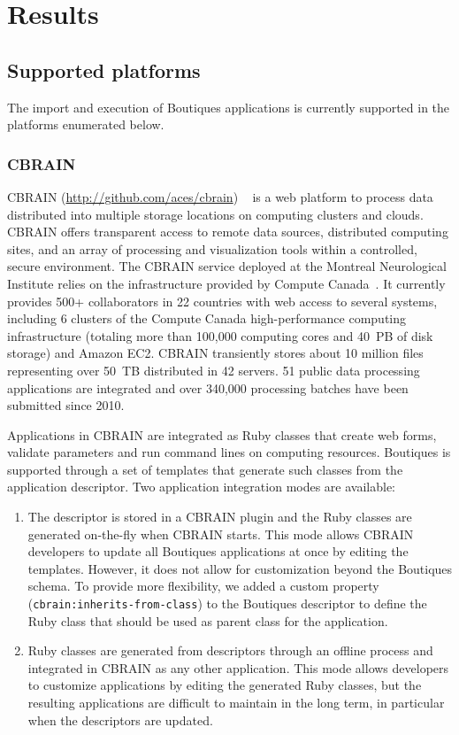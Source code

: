 \documentclass[a4paper,num-refs]{oup-contemporary}
\newcommand{\boutiques}{Boutiques\xspace}
\begin{document}
\section{Results}

\subsection{Supported platforms}

The import and execution of \boutiques applications is currently
supported in the platforms enumerated below.

\subsubsection{CBRAIN}

CBRAIN (\url{http://github.com/aces/cbrain}) ~\cite{SHER-14} is a web
platform to process data distributed into multiple storage
locations on computing clusters and clouds. CBRAIN offers transparent
access to remote data sources, distributed computing sites, and an
array of processing and visualization tools within a controlled,
secure environment.  The CBRAIN service deployed at the Montreal
Neurological Institute relies on the infrastructure provided by
Compute Canada~\cite{das2016mni}. It currently provides 500+
collaborators in 22 countries with web access to several systems,
including 6 clusters of the Compute Canada high-performance computing
infrastructure (totaling more than 100,000 computing cores and 40~PB of
disk storage) and Amazon EC2. CBRAIN transiently stores about 10
million files representing over 50~TB distributed in 42 servers. 51
public data processing applications are integrated and over 340,000
processing batches have been submitted since 2010.

Applications in CBRAIN are integrated as Ruby classes that create web
forms, validate parameters and run command lines on computing
resources. \boutiques is supported through a set of templates that
generate such classes from the application descriptor. Two application
integration modes are available:
\begin{enumerate}
  \item The descriptor is stored in a CBRAIN plugin and the Ruby
    classes are generated on-the-fly when CBRAIN starts. This mode
    allows CBRAIN developers to update all \boutiques applications at
    once by editing the templates. However, it does not allow for
    customization beyond the \boutiques schema. To provide more
    flexibility, we added a custom property
    (\texttt{cbrain:inherits-from-class}) to the \boutiques descriptor
    to define the Ruby class that should be used as parent class for
    the application.
  \item Ruby classes are generated from descriptors
    through an offline process and integrated in CBRAIN as any other
    application. This mode allows developers to customize applications
    by editing the generated Ruby classes, but the resulting
    applications are difficult to maintain in the long term, in
    particular when the descriptors are updated.
\end{enumerate}
\end{document}
